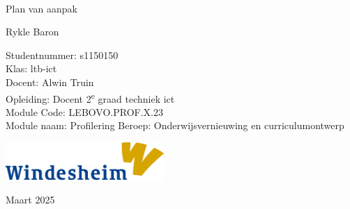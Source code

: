 {
\sffamily
\centering
\Large

~\vspace{\fill}

{\huge\color{TitleColor}
Plan van aanpak 
}

\vspace{2.5cm}

{\LARGE
Rykle Baron
}

\vspace{3.5cm}

Studentnummer: s1150150 \\
Klas: ltb-ict \\
Docent: Alwin Truin  \\
Opleiding: Docent 2\textsuperscript{e} graad techniek ict \\
Module Code: LEBOVO.PROF.X.23\\
Module naam: Profilering Beroep: Onderwijsvernieuwing en curriculumontwerp \\


\vspace{3.5cm}

\hspace{13mm}\includegraphics[width=6cm]{images/windesheim.pdf}

\vspace{\fill}

Maart 2025

}